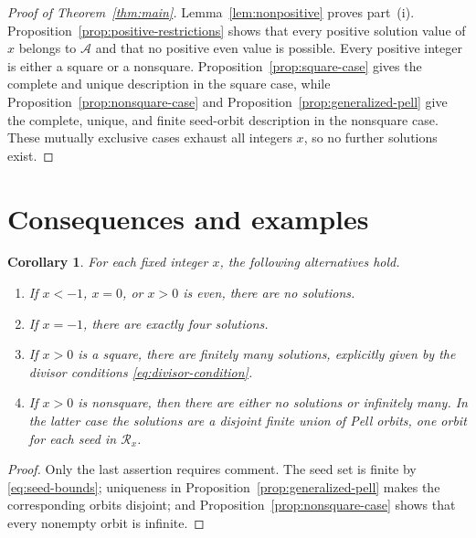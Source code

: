 \documentclass[a4paper,11pt]{amsart}
\numberwithin{equation}{section}
\newtheorem{corollary}[theorem]{Corollary}
\theoremstyle{definition}
\theoremstyle{remark}
\newcommand{\Acal}{\mathcal A}
\newcommand{\Rcal}{\mathcal R}
\begin{document}
\begin{proof}[Proof of Theorem~\ref{thm:main}]
Lemma~\ref{lem:nonpositive} proves part~\textup{(i)}.
Proposition~\ref{prop:positive-restrictions} shows that every positive
solution value of \(x\) belongs to \(\Acal\) and that no positive even value
is possible.  Every positive integer is either a square or a nonsquare.
Proposition~\ref{prop:square-case} gives the complete and unique description
in the square case, while Proposition~\ref{prop:nonsquare-case} and
Proposition~\ref{prop:generalized-pell} give the complete, unique, and finite
seed-orbit description in the nonsquare case.  These mutually exclusive
cases exhaust all integers \(x\), so no further solutions exist.
\end{proof}

\section{Consequences and examples}

\begin{corollary}\label{cor:fixed-x}
For each fixed integer \(x\), the following alternatives hold.
\begin{enumerate}[label=\textup{(\roman*)},leftmargin=2.2em]
\item If \(x<-1\), \(x=0\), or \(x>0\) is even, there are no solutions.
\item If \(x=-1\), there are exactly four solutions.
\item If \(x>0\) is a square, there are finitely many solutions, explicitly
given by the divisor conditions \eqref{eq:divisor-condition}.
\item If \(x>0\) is nonsquare, then there are either no solutions or
infinitely many.  In the latter case the solutions are a disjoint finite
union of Pell orbits, one orbit for each seed in \(\Rcal_x\).
\end{enumerate}
\end{corollary}

\begin{proof}
Only the last assertion requires comment.  The seed set is finite by
\eqref{eq:seed-bounds}; uniqueness in
Proposition~\ref{prop:generalized-pell} makes the corresponding orbits
disjoint; and Proposition~\ref{prop:nonsquare-case} shows that every nonempty
orbit is infinite.
\end{proof}
\end{document}
